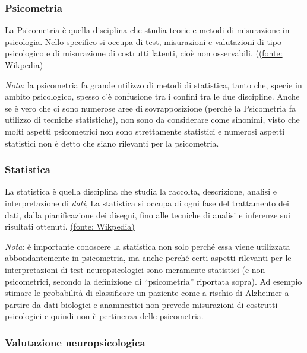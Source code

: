 \documentclass[
  italian,
  letterpaper,
  paper=6in:9in,
  pagesize=pdftex,
  headinclude=on,
  footinclude=on,
  11pt]{scrbook}
\begin{document}
\subsubsection*{Psicometria}\label{psicometria}

La Psicometria è quella disciplina che studia teorie e metodi di
misurazione in psicologia. Nello specifico si occupa di test,
misurazioni e valutazioni di tipo psicologico e di misurazione di
costrutti latenti, cioè non osservabili.
(\href{https://en.wikipedia.org/w/index.php?title=Psychometrics&oldid=1307897603}{(fonte:
Wikpedia)}

\emph{Nota}: la psicometria fa grande utilizzo di metodi di statistica,
tanto che, specie in ambito psicologico, spesso c'è confusione tra i
confini tra le due discipline. Anche se è vero che ci sono numerose aree
di sovrapposizione (perché la Psicometria fa utilizzo di tecniche
statistiche), non sono da considerare come sinonimi, visto che molti
aspetti psicometrici non sono strettamente statistici e numerosi aspetti
statistici non è detto che siano rilevanti per la psicometria.

\subsubsection*{Statistica}\label{statistica}

La statistica è quella disciplina che studia la raccolta, descrizione,
analisi e interpretazione di \emph{dati}, La statistica si occupa di
ogni fase del trattamento dei dati, dalla pianificazione dei disegni,
fino alle tecniche di analisi e inferenze sui risultati ottenuti.
\href{https://en.wikipedia.org/w/index.php?title=Statistics&oldid=1307451692}{(fonte:
Wikpedia)}

\emph{Nota}: è importante conoscere la statistica non solo perché essa
viene utilizzata abbondantemente in psicometria, ma anche perché certi
aspetti rilevanti per le interpretazioni di test neuropsicologici sono
meramente statistici (e non psicometrici, secondo la definizione di
``psicometria'' riportata sopra). Ad esempio stimare le probabilità di
classificare un paziente come a rischio di Alzheimer a partire da dati
biologici e anamnestici non prevede misurazioni di costrutti psicologici
e quindi non è pertinenza delle psicometria.

\subsubsection*{Valutazione
neuropsicologica}\label{valutazione-neuropsicologica}
\end{document}
